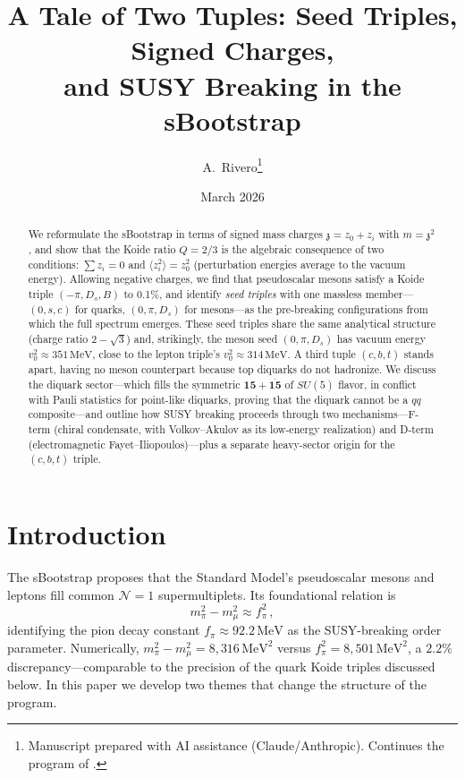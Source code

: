 \documentclass[12pt,a4paper]{article}
\title{A Tale of Two Tuples: Seed Triples, Signed Charges, \\
and SUSY Breaking in the sBootstrap}
\author{A.~Rivero\thanks{Manuscript prepared with AI assistance (Claude/Anthropic). 
Continues the program of \cite{Rivero2005,Rivero2012}.}}
\date{March 2026}
\newcommand{\MeV}{\,\text{MeV}}
\newcommand{\zch}{\mathfrak{z}}
\begin{document}
\maketitle

\begin{abstract}
We reformulate the sBootstrap in terms of signed mass charges 
$\zch = z_0 + z_i$ with $m = \zch^2$, and show that the Koide ratio 
$Q = 2/3$ is the algebraic consequence of two conditions: 
$\sum z_i = 0$ and $\langle z_i^2\rangle = z_0^2$ (perturbation 
energies average to the vacuum energy). Allowing negative charges, 
we find that pseudoscalar mesons satisfy a Koide triple 
$(-\pi, D_s, B)$ to 0.1\%, and identify \emph{seed triples} with 
one massless member---$(0, s, c)$ for quarks, $(0, \pi, D_s)$ for 
mesons---as the pre-breaking configurations from which the full 
spectrum emerges. These seed triples share the same analytical 
structure (charge ratio $2-\sqrt{3}$) and, strikingly, the meson 
seed $(0,\pi,D_s)$ has vacuum energy $v_0^2 \approx 351\MeV$, 
close to the lepton triple's $v_0^2 \approx 314\MeV$. A third 
tuple $(c,b,t)$ stands apart, having no meson counterpart because 
top diquarks do not hadronize. We discuss the diquark sector---which 
fills the symmetric $\mathbf{15} + \overline{\mathbf{15}}$ of $SU(5)$ 
flavor, in conflict with Pauli statistics for point-like diquarks, 
proving that the diquark cannot be a $qq$ composite---and outline 
how SUSY breaking proceeds through two mechanisms---F-term (chiral 
condensate, with Volkov--Akulov as its low-energy realization) and 
D-term (electromagnetic Fayet--Iliopoulos)---plus a separate 
heavy-sector origin for the $(c,b,t)$ triple.
\end{abstract}

\tableofcontents

\section{Introduction}
\label{sec:intro}

The sBootstrap \cite{Rivero2005,Rivero2012} proposes that the Standard 
Model's pseudoscalar mesons and leptons fill common $\mathcal{N}=1$ 
supermultiplets. Its foundational relation is
\begin{equation}
\label{eq:pimu}
m_\pi^2 - m_\mu^2 \approx f_\pi^2\,,
\end{equation}
identifying the pion decay constant $f_\pi \approx 92.2\MeV$ as the 
SUSY-breaking order parameter. Numerically, $m_\pi^2 - m_\mu^2 = 
8{,}316\MeV^2$ versus $f_\pi^2 = 8{,}501\MeV^2$, a $2.2\%$ 
discrepancy---comparable to the precision of the quark Koide triples 
discussed below. In this paper we develop two themes 
that change the structure of the program.
\end{document}
